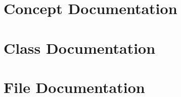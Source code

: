 \documentclass[twoside]{book}
\newcommand{\+}{\discretionary{\mbox{\scriptsize$\hookleftarrow$}}{}{}}
\newcommand{\clearemptydoublepage}{%
    \newpage{\pagestyle{empty}\cleardoublepage}%
  }
\begin{document}
\chapter{Concept Documentation}


\chapter{Class Documentation}











\chapter{File Documentation}


















  \backmatter
  \newpage
  \clearemptydoublepage
  \printindex
\end{document}
